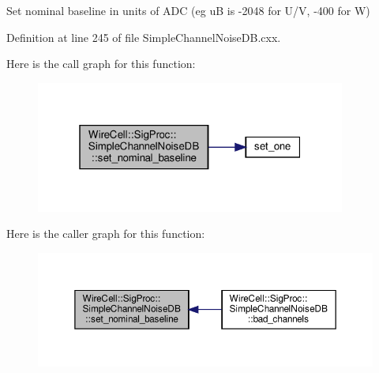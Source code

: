 Set nominal baseline in units of A\+DC (eg uB is -\/2048 for U/V, -\/400 for W) 



Definition at line 245 of file Simple\+Channel\+Noise\+D\+B.\+cxx.

Here is the call graph for this function\+:
\nopagebreak
\begin{figure}[H]
\begin{center}
\leavevmode
\includegraphics[width=289pt]{class_wire_cell_1_1_sig_proc_1_1_simple_channel_noise_d_b_a566b36743c0a1cb0bd831a0086dad3b7_cgraph}
\end{center}
\end{figure}
Here is the caller graph for this function\+:
\nopagebreak
\begin{figure}[H]
\begin{center}
\leavevmode
\includegraphics[width=350pt]{class_wire_cell_1_1_sig_proc_1_1_simple_channel_noise_d_b_a566b36743c0a1cb0bd831a0086dad3b7_icgraph}
\end{center}
\end{figure}
\mbox{\label{class_wire_cell_1_1_sig_proc_1_1_simple_channel_noise_d_b_a08eb429fdab1899edfe52bf8593ba56e}} 
